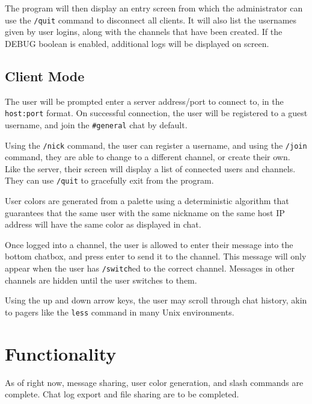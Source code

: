 \documentclass{article}
\begin{document}
The program will then display an entry screen from which the administrator can use the \verb|/quit| command to disconnect all clients. It will also list the usernames given by user logins, along with the channels that have been created. If the DEBUG boolean is enabled, additional logs will be displayed on screen.

\subsection{Client Mode}
The user will be prompted enter a server address/port to connect to, in the \verb|host:port| format. On successful connection, the user will be registered to a guest username, and join the \verb|#general| chat by default.

Using the \verb|/nick| command, the user can register a username, and using the \verb|/join| command, they are able to change to a different channel, or create their own. Like the server, their screen will display a list of connected users and channels. They can use \verb|/quit| to gracefully exit from the program.

User colors are generated from a palette using a deterministic algorithm that guarantees that the same user with the same nickname on the same host IP address will have the same color as displayed in chat.

Once logged into a channel, the user is allowed to enter their message into the bottom chatbox, and press enter to send it to the channel. This message will only appear when the user has \verb|/switch|ed to the correct channel. Messages in other channels are hidden until the user switches to them.

Using the up and down arrow keys, the user may scroll through chat history, akin to pagers like the \verb|less| command in many Unix environments.

\section{Functionality}
As of right now, message sharing, user color generation, and slash commands are complete. Chat log export and file sharing are to be completed.
\end{document}
